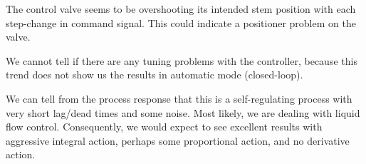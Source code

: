 \vskip 10pt

The control valve seems to be overshooting its intended stem position with each step-change in command signal.  This could indicate a positioner problem on the valve.

\vskip 10pt

We cannot tell if there are any tuning problems with the controller, because this trend does not show us the results in automatic mode (closed-loop).

\vskip 10pt

We can tell from the process response that this is a self-regulating process with very short lag/dead times and some noise.  Most likely, we are dealing with liquid flow control.  Consequently, we would expect to see excellent results with aggressive integral action, perhaps some proportional action, and no derivative action.











